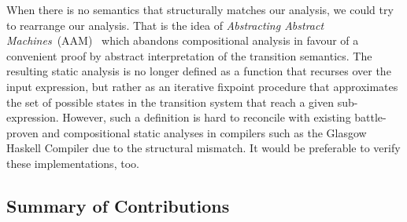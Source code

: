 When there is no semantics that structurally matches our analysis, we could
try to rearrange our analysis.
That is the idea of \emph{Abstracting Abstract Machines}~(AAM)~\citep{aam} which
abandons compositional analysis in favour of a convenient proof by abstract
interpretation of the transition semantics.
The resulting static analysis is no longer defined as a function that recurses
over the input expression, but rather as an iterative fixpoint procedure that
approximates the set of possible states in the transition system that reach a
given sub-expression.
However, such a definition is hard to reconcile with existing battle-proven and
compositional static analyses in compilers such as the Glasgow Haskell Compiler
due to the structural mismatch.
It would be preferable to verify these implementations, too.


\subsection{Summary of Contributions}

